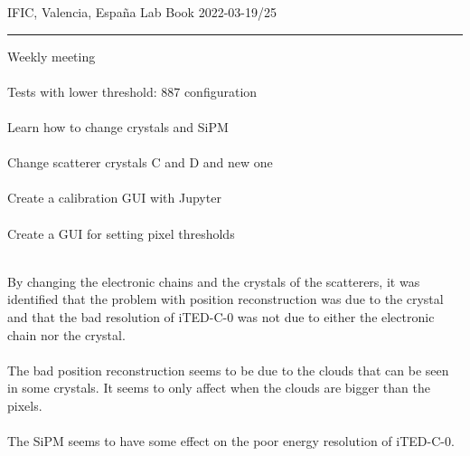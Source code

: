 \begin{center}
  {\Large IFIC, Valencia, España} \hfill {\Large Lab Book} \hfill {\Large 2022-03-19/25}\\
  \rule{\textwidth}{1pt}
\end{center}

\begin{minipage}[t][0.45\textheight][t]{0.97\linewidth}
  \begin{minipage}[t]{0.49\textwidth}
    \hspace{10pt}Weekly meeting\\~\\
    \hspace{10pt}Tests with lower threshold: 887 configuration\\~\\
    \hspace{10pt}Learn how to change crystals and SiPM\\~\\
    \hspace{10pt}Change scatterer crystals C and D and new one\\~\\
    \hspace{10pt}Create a calibration GUI with Jupyter\\~\\
    \hspace{10pt}Create a GUI for setting pixel thresholds\\~\\
  \end{minipage}
  \begin{minipage}[t]{0.49\textwidth}
    \begin{minipage}[t][0.22\textheight][t]{\textwidth}
        By changing the electronic chains and the crystals of the scatterers, it was identified that the problem with position reconstruction was due to the crystal and that the bad resolution of iTED-C-0 was not due to either the electronic chain nor the crystal.\\~\\
        The bad position reconstruction seems to be due to the clouds that can be seen in some crystals. It seems to only affect when the clouds are bigger than the pixels.\\~\\
        The SiPM seems to have some effect on the poor energy resolution of iTED-C-0.
    \end{minipage}
    \begin{minipage}[t][0.22\textheight][t]{\textwidth}
    \end{minipage}
  \end{minipage}  
\end{minipage}

